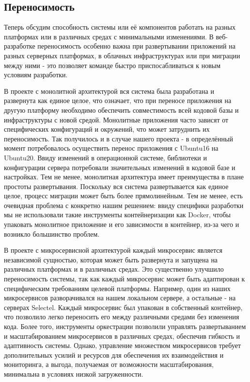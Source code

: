 \subsection{Переносимость}
    Теперь обсудим способность системы или её компонентов работать на разных платформах или в различных средах с минимальными изменениями. В веб-разработке переносимость особенно важна при развертывании приложений на разных серверных платформах, в облачных инфраструктурах или при миграции между ними - это позволяет команде быстро приспосабливаться к новым условиям разработки.
    
    В проекте с монолитной архитектурой вся система была разработана и развернута как единое целое, что означает, что при переносе приложения на другую платформу необходимо обеспечить совместимость всей кодовой базы и инфраструктуры с новой средой. Монолитные приложения часто зависят от специфических конфигураций и окружений, что может затруднить их переносимость. Так получилось и в случае нашего проекта - в определённый момент потребовалось осуществить перенос приложения с Ubuntu16 на Ubuntu20. Ввиду изменений в операционной системе, библиотеки и конфигурации сервера потребовали значительных изменений в кодовой базе и настройках. Тем не менее, монолитная архитектура имеет преимущества в плане простоты развертывания. Поскольку вся система развертывается как единое целое, процесс миграции может быть более прямолинейным. Тем не менее, есть очевидная проблема с конкретно нашим решением: ввиду специфики разработки мы не использовали такие инструменты контейнеризации как Docker, чтобы упаковать монолитное приложение и его зависимости в контейнер, из-за чего и возникло большинство проблем.
    
    В проекте с микросервисной архитектурой каждый микросервис является независимой сущностью, которая может быть развернута и запущена на различных платформах и в различных средах. Это существенно улучшило переносимость системы, так как каждый микросервис может быть адаптирован к специфическим требованиям целевой платформы. Например, один из наших микросервисов разворачивался на нашем локальном сервере, а остальные - на серверах Selectel. Каждый микросервис был упакован в собственный контейнер, что позволило легко переносить его между различными средами без изменения кода. Более того, инструменты оркестрации позволили управлять развертыванием и масштабированием микросервисов в различных средах, обеспечив гибкость и адаптивность системы. Однако, управление множеством микросервисов требует дополнительных усилий и ресурсов для обеспечения их взаимодействия и мониторинга, а выгода, получаемая от возможности масштабирования, минимальна в условиях низкой загруженности.
    
